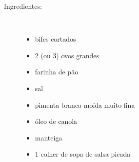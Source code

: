 \documentclass [11pt, letterpaper] {article}
\begin{document}
\begin {description}

\item [Ingredientes:] \ \\
\begin {itemize}
\item bifes cortados
\item 2 (ou 3) ovos grandes
\item farinha de pão
\item sal
\item pimenta branca moída muito fina
\item óleo de canola
\item manteiga
\item 1 colher de sopa de salsa picada
\end {itemize}


\end{description}
\end{document}

